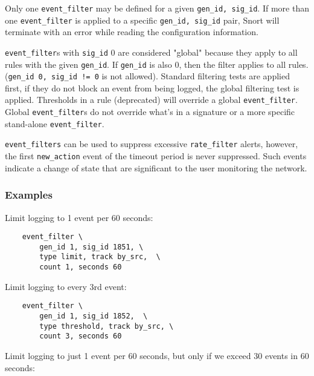 \documentclass[english]{report}
\newenvironment{note}{
\samepage
    \vspace{10pt}{\textsf{
        {\hspace{7pt}\Huge{$\triangle$\hspace{-12.5pt}{\Large{$^!$}}}}\hspace{5pt}
        {\Large{NOTE}}
    }
    }
   \begin{center}
    \par\vspace{-17pt}

    \begin{lrbox}{\savepar}
    \begin{minipage}[r]{6in}
}
{
    \end{minipage}
    \end{lrbox}
    \fbox{
        \usebox{
            \savepar
	}
    }
    \par\vskip10pt
    \end{center}
}
\newenvironment{note}{
        \begin{rawhtml}
        <p><table border="1"><tr><td><b>
        Note:&nbsp;&nbsp;</b>
        \end{rawhtml}
}{
        \begin{rawhtml}
        </b></td></tr></table></p>
        \end{rawhtml}
}
\begin{document}
\begin{note}

Only one \texttt{event\_filter} may be defined for a given \texttt{gen\_id,
sig\_id}.  If more than one \texttt{event\_filter} is applied to a specific
\texttt{gen\_id, sig\_id} pair, Snort will terminate with an error while
reading the configuration information. 

\end{note}

\texttt{event\_filter}s with \texttt{sig\_id} 0 are considered "global" because
they apply to all rules with the given \texttt{gen\_id}.  If \texttt{gen\_id}
is also 0, then the filter applies to all rules.  (\texttt{gen\_id 0, sig\_id
!= 0} is not allowed).  Standard filtering tests are applied first, if they do
not block an event from being logged, the global filtering test is applied.
Thresholds in a rule (deprecated) will override a global
\texttt{event\_filter}.  Global \texttt{event\_filter}s do not override what's
in a signature or a more specific stand-alone \texttt{event\_filter}.

\begin{note}
\texttt{event\_filters} can be used to suppress excessive \texttt{rate\_filter}
alerts, however, the first \texttt{new\_action} event of the timeout period is
never suppressed.  Such events indicate a change of state that are significant
to the user monitoring the network.
\end{note}

\subsubsection{Examples}

Limit logging to 1 event per 60 seconds:

\begin{verbatim}
    event_filter \
        gen_id 1, sig_id 1851, \
        type limit, track by_src,  \
        count 1, seconds 60
\end{verbatim}

Limit logging to every 3rd event:

\begin{verbatim}
    event_filter \
        gen_id 1, sig_id 1852,  \
        type threshold, track by_src, \
        count 3, seconds 60
\end{verbatim}

Limit logging to just 1 event per 60 seconds, but only if we exceed 30 events
in 60 seconds:
\end{document}
